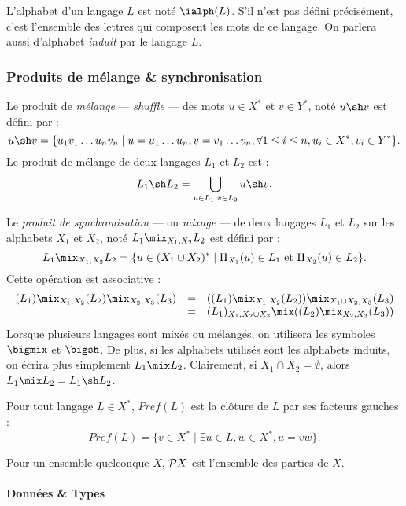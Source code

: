 L'alphabet d'un
langage $L$ est not\'e $\ialph(L)$. S'il n'est pas d\'efini
pr\'ecis\'ement, c'est l'ensemble des 
lettres qui composent les mots de ce langage. On parlera aussi
d'alphabet \emph{induit} par le langage $L$.

\subsubsection{Produits de m\'elange \& synchronisation}

Le produit de \emph{m\'elange}  --- \emph{shuffle} --- des mots $u\in
X^*$ et
$v\in Y^*$, not\'e $u \sh v$ est d\'efini par :
\begin{equation}
u \sh v = \{u_1v_1\dots u_nv_n \mid u =
u_1\dots u_n, v = v_1\dots v_n, \forall 1\leq i \leq n, u_i\in X^*,v_i \in Y^*\}.\label{eq:def-sh}
\end{equation}
Le produit de m\'elange de deux langages $L_1$ et $L_2$ est :
$$L_1 \sh L_2 = \bigcup_{u \in L_1, v\in L_2} u \sh v.$$

Le \emph{produit de synchronisation}\cite{dub86phd} --- ou  \emph{mixage}
--- de deux langages $L_1$ et $L_2$
sur les alphabets $X_1$ et $X_2$, not\'e $L_1 \mix_{X_1,X_2} L_2$  est d\'efini par :
\begin{equation}
L_1 \mix_{X_1,X_2} L_2 = \{u \in (X_1 \cup X_2)^* \mid
\Pi_{X_1}(u) \in L_1 \mbox{~et~} \Pi_{X_2}(u) \in L_2
\}.\label{eq:def-mix}
\end{equation}
Cette op\'eration est associative :
$$\begin{array}{lcl}(L_1) \mix_{X_1,X_2} (L_2) \mix_{X_2,X_3} (L_3) &=& ((L_1) \mix_{X_1,X_2} (L_2)) \mix_{X_1 \cup X_2,X_3} (L_3)\\
&=&  (L_1)_{X_1,X_2 \cup X_3} \mix ((L_2) \mix_{X_2,X_3} (L_3))\\
\end{array}$$ 
Lorsque plusieurs langages sont mix\'es ou m\'elang\'es, on
utilisera les 
symboles $\bigmix$ et $\bigsh$. De plus, si les alphabets utilis\'es
sont les alphabets induits, on \'ecrira plus simplement $L_1\mix
L_2$. Clairement, si $X_1 \cap X_2 =\emptyset$, alors $L_1\mix L_2 =
L_1 \sh L_2$. 

Pour tout langage $L\in X^*$, $Pref(L)$ est la cl\^oture de $L$ par ses
facteurs gauches :
$$
Pref(L) = \{v\in X^* \mid \exists u\in L, w\in X^*, u=vw\}.
$$


Pour un ensemble quelconque $X$, ${\cal P} X$ est l'ensemble des parties de
$X$.

\paragraph{Donn\'ees \& Types}

